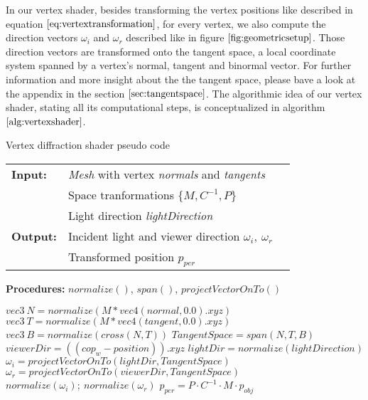 In our vertex shader, besides transforming the vertex positions like described in equation $\ref{eq:vertextransformation}$, for every vertex, we also compute the direction vectors $\omega_i$ and $\omega_r$ described like in figure $\ref{fig:geometricsetup}$. Those direction vectors are transformed onto the tangent space, a local coordinate system spanned by a vertex's normal, tangent and binormal vector. For further information and more insight about the the tangent space, please bave a look at the appendix in the section $\ref{sec:tangentspace}$. The algorithmic idea of our vertex shader, stating all its computational steps, is conceptualized in algorithm $\ref{alg:vertexshader}$.

\begin{algorithm}[H]
\caption{Vertex diffraction shader pseudo code}
\begin{table}[H]
  \begin{tabular}{@{}lll@{}}
    \textbf{Input:} & \emph{Mesh} with vertex \emph{normals} and \emph{tangents}  \\
    & Space tranformations $\{M, C^{-1}, P\}$  \\
    & Light direction \emph{lightDirection}  \\
    \textbf{Output:} & Incident light and viewer direction $\omega_i,\ \omega_r$ \\
    & Transformed position $p_{per}$ \\
  \end{tabular} 
\end{table}
\textbf{Procedures:} $normalize()$, $span()$, $projectVectorOnTo()$  \\
\setlength{\fboxrule}{0pt} 
\begin{boxedminipage}{1.0\textwidth}
  \begin{algorithmic}[1]
        \State $ vec3 \ N = normalize(M * vec4(normal,0.0).xyz)$
        \State $ vec3 \ T = normalize(M * vec4(tangent,0.0).xyz)$
        \State $ vec3 \ B = normalize(cross(N, T))$
        \State $ TangentSpace = span(N, T, B)$
        \State $ viewerDir = ((cop_{w}-position)).xyz$
        \State $ lightDir = normalize(lightDirection)$
        \State $ \omega_i = projectVectorOnTo(lightDir, TangentSpace)$
        \State $ \omega_r = projectVectorOnTo(viewerDir, TangentSpace)$
        \State $normalize(\omega_i); \ normalize(\omega_r)$
        \State $p_{per} = P \cdot C^{-1} \cdot M \cdot p_{obj}$
      \EndFor
  \end{algorithmic}
  \end{boxedminipage}
  \vskip1.5pt
\label{alg:vertexshader}
\end{algorithm}

